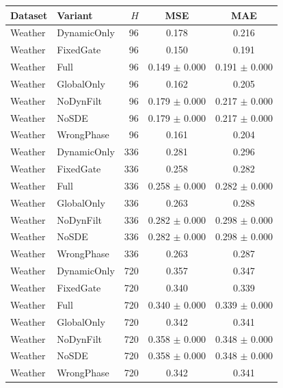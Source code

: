 \begin{tabular}{llrcc}
\toprule
Dataset & Variant & $H$ & MSE & MAE \\
\midrule
Weather & DynamicOnly & 96 & 0.178 & 0.216 \\
Weather & FixedGate & 96 & 0.150 & 0.191 \\
Weather & Full & 96 & 0.149 $\pm$ 0.000 & 0.191 $\pm$ 0.000 \\
Weather & GlobalOnly & 96 & 0.162 & 0.205 \\
Weather & NoDynFilt & 96 & 0.179 $\pm$ 0.000 & 0.217 $\pm$ 0.000 \\
Weather & NoSDE & 96 & 0.179 $\pm$ 0.000 & 0.217 $\pm$ 0.000 \\
Weather & WrongPhase & 96 & 0.161 & 0.204 \\
Weather & DynamicOnly & 336 & 0.281 & 0.296 \\
Weather & FixedGate & 336 & 0.258 & 0.282 \\
Weather & Full & 336 & 0.258 $\pm$ 0.000 & 0.282 $\pm$ 0.000 \\
Weather & GlobalOnly & 336 & 0.263 & 0.288 \\
Weather & NoDynFilt & 336 & 0.282 $\pm$ 0.000 & 0.298 $\pm$ 0.000 \\
Weather & NoSDE & 336 & 0.282 $\pm$ 0.000 & 0.298 $\pm$ 0.000 \\
Weather & WrongPhase & 336 & 0.263 & 0.287 \\
Weather & DynamicOnly & 720 & 0.357 & 0.347 \\
Weather & FixedGate & 720 & 0.340 & 0.339 \\
Weather & Full & 720 & 0.340 $\pm$ 0.000 & 0.339 $\pm$ 0.000 \\
Weather & GlobalOnly & 720 & 0.342 & 0.341 \\
Weather & NoDynFilt & 720 & 0.358 $\pm$ 0.000 & 0.348 $\pm$ 0.000 \\
Weather & NoSDE & 720 & 0.358 $\pm$ 0.000 & 0.348 $\pm$ 0.000 \\
Weather & WrongPhase & 720 & 0.342 & 0.341 \\
\bottomrule
\end{tabular}
